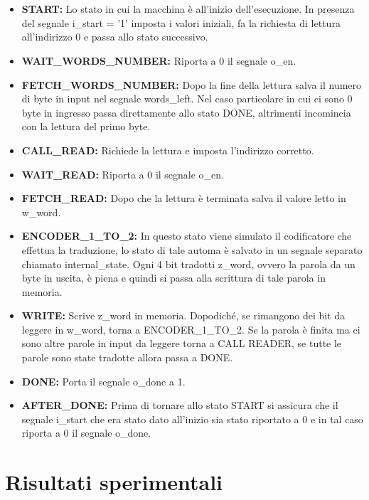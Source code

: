 \documentclass{article}
\begin{document}
\\
\\
\begin{itemize}
	\item \textbf{START:} Lo stato in cui la macchina è all'inizio dell'esecuzione. In presenza del segnale i\_start = '1' imposta i valori iniziali, fa la richiesta di lettura all'indirizzo 0 e passa allo stato successivo.
	\item \textbf{WAIT\_WORDS\_NUMBER:} Riporta a 0 il segnale o\_en.
	\item \textbf{FETCH\_WORDS\_NUMBER:} Dopo la fine della lettura salva il numero di byte in input nel segnale words\_left. Nel caso particolare in cui ci sono 0 byte in ingresso passa direttamente allo stato DONE, altrimenti incomincia con la lettura del primo byte.
	\item \textbf{CALL\_READ:} Richiede la lettura e imposta l'indirizzo corretto.
	\item \textbf{WAIT\_READ:} Riporta a 0 il segnale o\_en.
	\item \textbf{FETCH\_READ:} Dopo che la lettura è terminata salva il valore letto in w\_word.
	\item \textbf{ENCODER\_1\_TO\_2:} In questo stato viene simulato il codificatore che effettua la traduzione, lo stato di tale automa è salvato in un segnale separato chiamato internal\_state. Ogni 4 bit tradotti z\_word, ovvero la parola da un byte in uscita, è piena e quindi si passa alla scrittura di tale parola in memoria.
	\item \textbf{WRITE:} Scrive z\_word in memoria. Dopodiché, se rimangono dei bit da leggere in w\_word, torna a ENCODER\_1\_TO\_2. Se la parola è finita ma ci sono altre parole in input da leggere torna a CALL READER, se tutte le parole sono state tradotte allora passa a DONE.
	\item \textbf{DONE:} Porta il segnale o\_done a 1.
	\item \textbf{AFTER\_DONE:} Prima di tornare allo stato START si assicura che il segnale i\_start che era stato dato all'inizio sia stato riportato a 0 e in tal caso riporta a 0 il segnale o\_done.
\end{itemize}
\pagebreak

\section{Risultati sperimentali}
\end{document}
